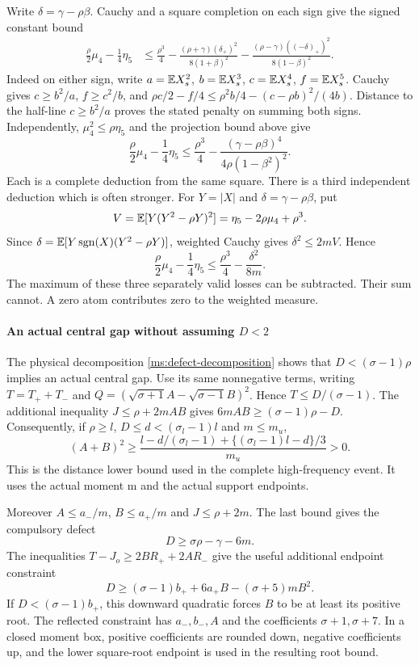 Write $\delta=\gamma-\rho\beta$. Cauchy and a square completion on
each sign give the signed constant bound
\begin{align*}
 \frac\rho2\mu_4-\frac14\eta_5
 &\le\frac{\rho^3}{4}
 -\frac{(\rho+\gamma)(\delta_+)^2}{8(1+\beta)^2}
 -\frac{(\rho-\gamma)((-\delta)_+)^2}{8(1-\beta)^2}.
\end{align*}
Indeed on either sign, write $a=\mathbb E X_s^2$, $b=\mathbb E X_s^3$,
$c=\mathbb E X_s^4$, $f=\mathbb E X_s^5$. Cauchy gives $c\ge b^2/a$,
$f\ge c^2/b$, and
$\rho c/2-f/4\le\rho^2b/4-(c-\rho b)^2/(4b)$.
Distance to the half-line $c\ge b^2/a$ proves the stated penalty
on summing both signs. Independently,
$\mu_4^2\le\rho\eta_5$ and the projection bound above give
\[
 \frac\rho2\mu_4-\frac14\eta_5
 \le\frac{\rho^3}{4}
 -\frac{(\gamma-\rho\beta)^4}{4\rho(1-\beta^2)^2}.
\]
Each is a complete deduction from the same square.
There is a third independent deduction which is often stronger.
For $Y=|X|$ and $\delta=\gamma-\rho\beta$, put
\[
 V=\mathbb E[Y(Y^2-\rho Y)^2]=\eta_5-2\rho\mu_4+\rho^3.
\]
Since
$\delta=\mathbb E[Y\operatorname{sgn}(X)(Y^2-\rho Y)]$,
weighted Cauchy gives $\delta^2\le2mV$. Hence
\begin{equation}\label{v9:entry:weighted-constant-loss}
 \frac\rho2\mu_4-\frac14\eta_5
 \le\frac{\rho^3}{4}-\frac{\delta^2}{8m}.
\end{equation}
The maximum of these three separately valid losses can be subtracted.
Their sum cannot. A zero atom contributes zero to the weighted measure.

\paragraph{An actual central gap without assuming $D<2$}
The physical decomposition \eqref{ms:defect-decomposition} shows that
$D<(\sigma-1)\rho$ implies an actual central gap. Use its same
nonnegative terms, writing $T=T_++T_-$ and
$Q=(\sqrt{\sigma+1}A-\sqrt{\sigma-1}B)^2$.
Hence $T\le D/(\sigma-1)$. The additional inequality
$J\le\rho+2mAB$ gives $6mAB\ge(\sigma-1)\rho-D$.
Consequently, if $\rho\ge l$, $D\le d<(\sigma_l-1)l$ and $m\le m_u$,
\begin{equation}\label{v9:entry:gap-distance}
 (A+B)^2\ge
 \frac{l-d/(\sigma_l-1)+\{(\sigma_l-1)l-d\}/3}{m_u}>0.
\end{equation}
This is the distance lower bound used in the complete high-frequency
event. It uses the actual moment m and the actual support endpoints.

Moreover $A\le a_-/m$, $B\le a_+/m$ and $J\le\rho+2m$.
The last bound gives the compulsory defect
\[
 D\ge \sigma\rho-\gamma-6m.
\]
The inequalities $T-J_o\ge2BR_++2AR_-$ give the useful additional
endpoint constraint
\[
 D\ge(\sigma-1)b_++6a_+B-(\sigma+5)mB^2.
\]
If $D<(\sigma-1)b_+$, this downward quadratic forces $B$ to be at
least its positive root. The reflected constraint has $a_-,b_-,A$
and the coefficients $\sigma+1,\sigma+7$. In a closed moment box,
positive coefficients are rounded down, negative coefficients up, and
the lower square-root endpoint is used in the resulting root bound.

